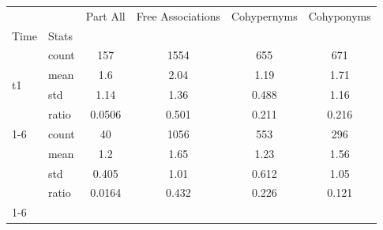 \begin{tabular}{llcccc}
\toprule
 &  & Part All & Free Associations & Cohypernyms & Cohyponyms \\
Time & Stats &  &  &  &  \\
\midrule
\multirow[t]{4}{*}{t1} & count & 157 & 1554 & 655 & 671 \\
 & mean & 1.6 & 2.04 & 1.19 & 1.71 \\
 & std & 1.14 & 1.36 & 0.488 & 1.16 \\
 & ratio & 0.0506 & 0.501 & 0.211 & 0.216 \\
\cmidrule{1-6}
\multirow[t]{4}{*}{t2} & count & 40 & 1056 & 553 & 296 \\
 & mean & 1.2 & 1.65 & 1.23 & 1.56 \\
 & std & 0.405 & 1.01 & 0.612 & 1.05 \\
 & ratio & 0.0164 & 0.432 & 0.226 & 0.121 \\
\cmidrule{1-6}
\bottomrule
\end{tabular}

